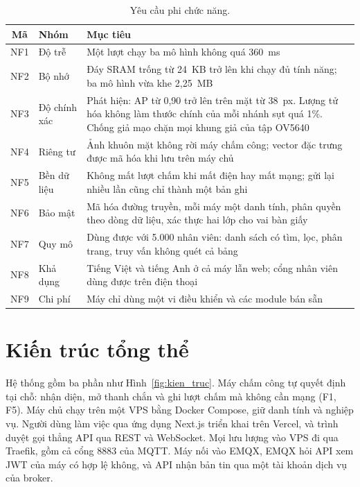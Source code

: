 \documentclass[../DoAn.tex]{subfiles}
\begin{document}
\begin{table}[!htb]
\centering
\small
\caption{Yêu cầu phi chức năng.}
\label{tab:yc_phi_chuc_nang}
\begin{tabular}{|c|L{2.6cm}|L{10.2cm}|}
\hline
\textbf{Mã} & \textbf{Nhóm} & \textbf{Mục tiêu} \\
\hline
NF1 & Độ trễ & Một lượt chạy ba mô hình không quá 360~ms \\
\hline
NF2 & Bộ nhớ & Đáy SRAM trống từ 24~KB trở lên khi chạy đủ tính năng; ba mô hình vừa khe 2,25~MB \\
\hline
NF3 & Độ chính xác & Phát hiện: AP từ 0,90 trở lên trên mặt từ 38~px. Lượng tử hóa không làm thước chính của mỗi nhánh sụt quá 1\%. Chống giả mạo chặn mọi khung giả của tập OV5640 \\
\hline
NF4 & Riêng tư & Ảnh khuôn mặt không rời máy chấm công; vector đặc trưng được mã hóa khi lưu trên máy chủ \\
\hline
NF5 & Bền dữ liệu & Không mất lượt chấm khi mất điện hay mất mạng; gửi lại nhiều lần cũng chỉ thành một bản ghi \\
\hline
NF6 & Bảo mật & Mã hóa đường truyền, mỗi máy một danh tính, phân quyền theo dòng dữ liệu, xác thực hai lớp cho vai bàn giấy \\
\hline
NF7 & Quy mô & Dùng được với 5.000 nhân viên: danh sách có tìm, lọc, phân trang, truy vấn không quét cả bảng \\
\hline
NF8 & Khả dụng & Tiếng Việt và tiếng Anh ở cả máy lẫn web; cổng nhân viên dùng được trên điện thoại \\
\hline
NF9 & Chi phí & Máy chỉ dùng một vi điều khiển và các module bán sẵn \\
\hline
\end{tabular}
\end{table}

\section{Kiến trúc tổng thể}
\label{section:3.2}

Hệ thống gồm ba phần như Hình~\ref{fig:kien_truc}. Máy chấm công tự quyết định tại
chỗ: nhận diện, mở thanh chắn và ghi lượt chấm mà không cần mạng (F1, F5). Máy chủ chạy
trên một VPS bằng Docker Compose, giữ danh tính và nghiệp vụ. Người dùng làm việc qua
ứng dụng Next.js triển khai trên Vercel, và trình duyệt gọi thẳng API qua REST và
WebSocket. Mọi lưu lượng vào VPS đi qua Traefik, gồm cả cổng 8883 của MQTT. Máy nối
vào EMQX, EMQX hỏi API xem JWT của máy có hợp lệ không, và API nhận bản tin qua một tài
khoản dịch vụ của broker.
\end{document}
